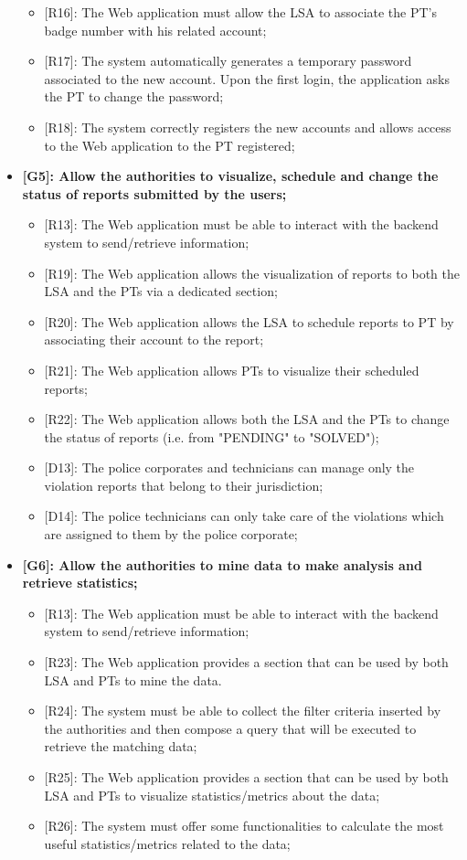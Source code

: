 \begin{itemize}
\begin{itemize}
      \item {[R16]}: The Web application must allow the LSA to associate the PT's badge number with his related account;
      \item {[R17]}: The system automatically generates a temporary password associated to the new account. Upon the first login, the application asks the PT to change the password;
      \item {[R18]}: The system correctly registers the new accounts and allows access to the Web application to the PT registered;       
    \end{itemize}
  \item \textbf{{[G5]}: Allow the authorities to visualize, schedule and change the status of reports submitted by the users;}
    \begin{itemize}
      \item {[R13]}: The Web application must be able to interact with the backend system to send/retrieve information;
      \item {[R19]}: The Web application allows the visualization of reports to both the LSA and the PTs via a dedicated section;
      \item {[R20]}: The Web application allows the LSA to schedule reports to PT by associating their account to the report;
      \item {[R21]}: The Web application allows PTs to visualize their scheduled reports;
      \item {[R22]}: The Web application allows both the LSA and the PTs to change the status of reports (i.e. from "PENDING" to "SOLVED");
      \item {[D13]}: The police corporates and technicians can manage only the violation reports that belong to their jurisdiction;
      \item {[D14]}: The police technicians can only take care of the violations which are assigned to them by the police corporate;
    \end{itemize}
  \item \textbf{{[G6]}: Allow the authorities to mine data to make analysis and retrieve statistics;}
    \begin{itemize}
      \item {[R13]}: The Web application must be able to interact with the backend system to send/retrieve information;
      \item {[R23]}: The Web application provides a section that can be used by both LSA and PTs to mine the data.
      \item {[R24]}: The system must be able to collect the filter criteria inserted by the authorities and then compose a query that will be executed to retrieve the matching data;
      \item {[R25]}: The Web application provides a section that can be used by both LSA and PTs to visualize statistics/metrics about the data;
      \item {[R26]}: The system must offer some functionalities to calculate the most useful statistics/metrics related to the data;
    \end{itemize}
    

\end{itemize}

